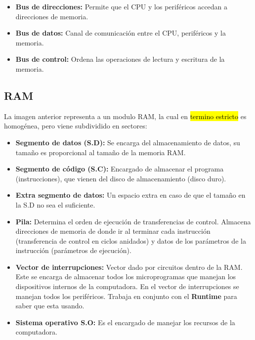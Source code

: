 \documentclass{templateNote}
\begin{document}
\begin{itemize}
    \item \textbf{Bus de direcciones:} Permite que el CPU y los periféricos accedan a direcciones de memoria.
    \item \textbf{Bus de datos:} Canal de comunicación entre el CPU, periféricos y la memoria.
    \item \textbf{Bus de control:} Ordena las operaciones de lectura y escritura de la memoria.
\end{itemize}
\newpage

\subsection*{\textbf{RAM}} 
\begin{figure}[H]
    \centering
\end{figure}

\noindent La imagen anterior representa a un modulo RAM, la cual en \hl{termino estricto} es homogénea, pero viene subdividido en sectores:
\begin{itemize}
    \item \textbf{Segmento de datos (S.D):} Se encarga del almacenamiento de datos, su tamaño es proporcional al tamaño de la memoria RAM.
    \item \textbf{Segmento de código (S.C):} Encargado de almacenar el programa (instrucciones), que vienen del disco de almacenamiento (disco duro).
    \item \textbf{Extra segmento de datos:} Un espacio extra en caso de que el tamaño en la S.D no sea el suficiente.
    \item \textbf{Pila:} Determina el orden de ejecución de transferencias de control. Almacena direcciones de memoria de donde ir al terminar cada instrucción 
    (transferencia de control en ciclos anidados) y datos de los parámetros de la instrucción (parámetros de ejecución).
    \item \textbf{Vector de interrupciones:} Vector dado por circuitos dentro de la RAM. Este se encarga de almacenar todos los microprogramas que manejan los 
    dispositivos internos de la computadora. En el vector de interrupciones se manejan todos los periféricos. Trabaja en conjunto con el \textbf{Runtime} 
    para saber que esta usando.
    \item \textbf{Sistema operativo S.O:} Es el encargado de manejar los recursos de la computadora.
\end{itemize}
\end{document}
